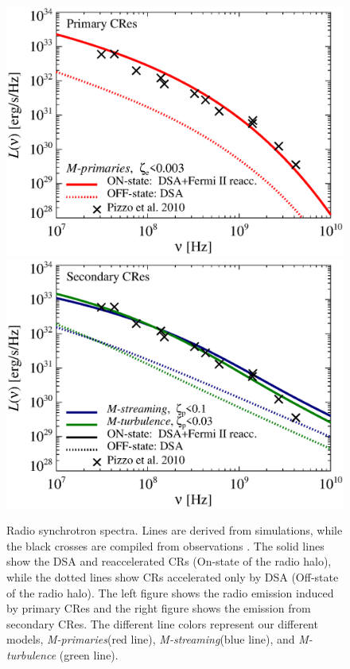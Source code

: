 \documentclass[fleqn,usenatbib,useAMS]{mnras}
\newcommand{\Mstream}{{\it M-streaming}\xspace}
\newcommand{\Mflatturb}{{\it M-turbulence}\xspace}
\newcommand{\Mprimary}{{\it M-primaries}\xspace}
\begin{document}
\begin{figure}
  \includegraphics[width=1.0\columnwidth]{sync.spec.pri.g72a.140.v6.eps}
  \includegraphics[width=1.0\columnwidth]{sync.spec.sec.g72a.140.v6.eps}
  \caption{Radio synchrotron spectra. Lines are derived from
    simulations, while the black crosses are compiled from
    observations \citet{2010PhDT.......259P}. The solid lines show the
    DSA and reaccelerated CRs (On-state of the radio halo), while the
    dotted lines show CRs accelerated only by DSA (Off-state of the
    radio halo). The left figure shows the radio emission induced by
    primary CRes and the right figure shows the emission from
    secondary CRes. The different line colors represent our different
    models, \Mprimary (red line), \Mstream (blue line), and \Mflatturb
    (green line).}
  \label{fig:sync_spectrum}
\end{figure}
\end{document}
